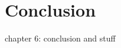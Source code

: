 \chapter[Conclusion]{Conclusion} \label{c:conclusion} \glsresetall
%
chapter 6: conclusion and stuff